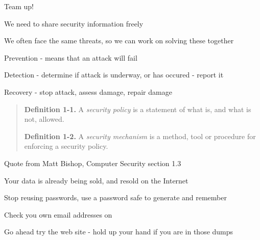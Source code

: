 \documentclass[Screen16to9,17pt]{foils}
\begin{document}


\begin{list1}
\item Team up!
\item We need to share security information freely
\item We often face the same threats, so we can work on solving these together
\end{list1}


\begin{list1}
\item Prevention - means that an attack will fail
\item Detection - determine if attack is underway, or has occured - report it
\item Recovery - stop attack, assess damage, repair damage
\end{list1}


\begin{quote}
{\bf Definition 1-1.} A \emph{security policy} is a statement of what is, and what is not, allowed.

{\bf Definition 1-2.} A \emph{security mechanism} is a method, tool or procedure for enforcing a security policy.
\end{quote}

Quote from Matt Bishop, Computer Security section 1.3




\begin{list1}
\item Your data is already being sold, and resold on the Internet
\item Stop reusing passwords, use a password safe to generate and remember
\item Check you own email addresses on 
\end{list1}

\centerline{Go ahead try the web site - hold up your hand if you are in those dumps}




\end{document}
